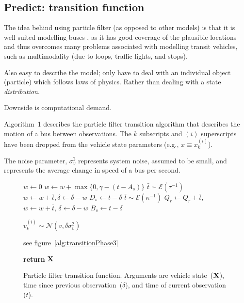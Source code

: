 \documentclass[draftcls,a4paper,onecolumn]{IEEEtran}\usepackage[]{graphicx}\usepackage[]{color}
\begin{document}
\subsection{Predict: transition function}
The idea behind using particle filter (as opposed to other models)
is that it is well suited modelling buses \cite{Hans_2015},
as it has good coverage of the plausible locations and thus overcomes
many problems associated with modelling transit vehicles,
such as multimodality (due to loops, traffic lights, and stops).

Also easy to describe the model;
only have to deal with an individual object (particle) which follows 
laws of physics.
Rather than dealing with a state \emph{distribution}.

Downside is computational demand.

Algorithm~1 describes the particle filter transition algorithm that
describes the motion of a bus between observations.
The $k$ subscripts and $(i)$ superscripts have been dropped from the
vehicle state parameters (e.g., $x \equiv x_k^{(i)}$).

The noise parameter, $\sigma_v^2$
represents system noise, assumed to be small, 
and represents the average change in speed of a bus per second.


\begin{figure}[bt]
  \begin{algorithmic}
    
    \State $w\gets 0$
      \State $w\gets w + \max\{0, \gamma - (t - A_s)\}$
      \State $\bar t \sim \mathcal{E}(\tau^{-1})$
      \State $w\gets w + \bar t, \delta\gets \delta - w$
        \State $D_s\gets t - \delta$
      \EndIf
      \State $\bar t \sim \mathcal{E}(\kappa^{-1})$
      \State $Q_r\gets Q_r + \bar t$, $w\gets w+\bar t$, $\delta\gets \delta - w$
        \State $B_s\gets t - \delta$
      \EndIf
    \EndIf
    \EndPhase
    
    
    \State $v_k^{(i)}\sim \mathcal{N}(v, \delta\sigma_v^2)$
    \EndPhase
    
    \State see figure~\ref{alg:transitionPhase3}
    \EndPhase
    
    \State \textbf{return} $\mathbf{X}$
    \EndFunction
  \end{algorithmic}
  \caption{Particle filter transition function. Arguments are vehicle state~($\mathbf{X}$), time since previous observation~($\delta$), and time of current observation ($t$).}
  \label{alg:transition}
\end{figure}
\end{document}

